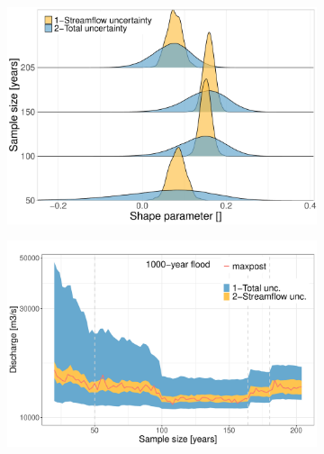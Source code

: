\documentclass[11pt]{article}
\begin{document}
\begin{figure}[p]
            \begin{subfigure}{0.47\textwidth}
                \centering
                \includegraphics[width=\linewidth]{Figs/11c-Shape_4cases.pdf}
                \caption{}
                \label{subfig:Form4cases}
            \end{subfigure}
            \begin{subfigure}{0.52\textwidth}
                \centering
                \includegraphics[width=\linewidth]{Figs/11d-Q1000SSize.pdf}
                \caption{}
                \label{subfig:SamplesQ1000}
            \end{subfigure}
            

\end{figure}
\end{document}
